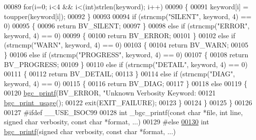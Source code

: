 \begin{DoxyCode}
{00089         \textcolor{keywordflow}{for}(i=0; i<4 && i<(int)strlen(keyword); i++)
00090         \{
00091             keyword[i] = toupper(keyword[i]);
00092         \}
00093         
00094         \textcolor{keywordflow}{if} (strncmp(\textcolor{stringliteral}{"SILENT"}, keyword, 4) == 0)
00095         \{
00096             \textcolor{keywordflow}{return} BV\_SILENT;
00097         \}
00098         \textcolor{keywordflow}{else} \textcolor{keywordflow}{if} (strncmp(\textcolor{stringliteral}{"ERROR"}, keyword, 4) == 0)
00099         \{
00100             \textcolor{keywordflow}{return} BV\_ERROR;
00101         \}
00102         \textcolor{keywordflow}{else} \textcolor{keywordflow}{if} (strncmp(\textcolor{stringliteral}{"WARN"}, keyword, 4) == 0)
00103         \{
00104             \textcolor{keywordflow}{return} BV\_WARN;
00105         \}
00106         \textcolor{keywordflow}{else} \textcolor{keywordflow}{if} (strncmp(\textcolor{stringliteral}{"PROGRESS"}, keyword, 4) == 0)
00107         \{
00108             \textcolor{keywordflow}{return} BV\_PROGRESS;
00109         \}
00110         \textcolor{keywordflow}{else} \textcolor{keywordflow}{if} (strncmp(\textcolor{stringliteral}{"DETAIL"}, keyword, 4) == 0)
00111         \{
00112             \textcolor{keywordflow}{return} BV\_DETAIL;
00113         \}
00114         \textcolor{keywordflow}{else} \textcolor{keywordflow}{if} (strncmp(\textcolor{stringliteral}{"DIAG"}, keyword, 4) == 0)
00115         \{
00116             \textcolor{keywordflow}{return} BV\_DIAG;
00117         \}
00118         \textcolor{keywordflow}{else}
00119         \{
00120             \hyperlink{bgc__io_8c_af287cce6e2aede1ce337de9319e80d0d}{bgc\_printf}(BV\_ERROR, \textcolor{stringliteral}{"Unknown Verbosity Keyword: %
00121             \hyperlink{bgc__io_8c_adcf0cce6fdd3c3d3531f826bede8bb66}{bgc\_print\_usage}();
00122             exit(EXIT\_FAILURE);
00123         \}
00124     \}
00125 \}
00126 
00127 \textcolor{preprocessor}{#ifdef \_\_USE\_ISOC99}
00128 \textcolor{keywordtype}{int} \_bgc\_printf(\textcolor{keyword}{const} \textcolor{keywordtype}{char} *file, \textcolor{keywordtype}{int} line, \textcolor{keywordtype}{signed} \textcolor{keywordtype}{char} verbosity, \textcolor{keyword}{const} \textcolor{keywordtype}{char} *format, ...)
00129 \textcolor{preprocessor}{#else}
\hypertarget{bgc__io_8c_source_l00130}{}\hyperlink{bgc__io_8c_af287cce6e2aede1ce337de9319e80d0d}{00130} \textcolor{keywordtype}{int} \hyperlink{bgc__io_8c_af287cce6e2aede1ce337de9319e80d0d}{bgc\_printf}(\textcolor{keywordtype}{signed} \textcolor{keywordtype}{char} verbosity, \textcolor{keyword}{const} \textcolor{keywordtype}{char} *format, ...)
}}
\end{DoxyCode}
